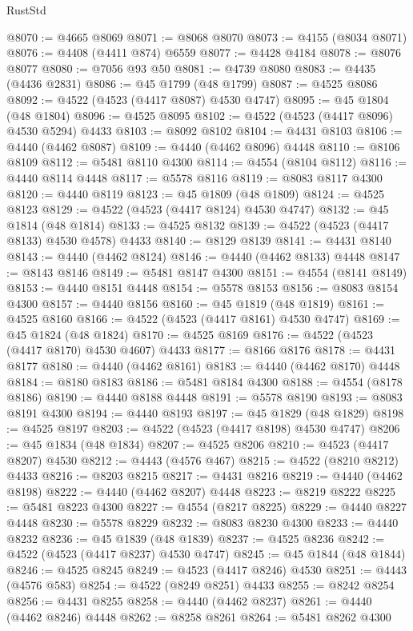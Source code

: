 \begin{lexlean}{RustStd}
\begin{coremodule}
{\begin{coremodule}
{{{{{{{{{{{{{{{{{{{{{{{{{{{{{{{{{{{{{{{{{{{{{{{{{{{{{{{{{{{{@8070 := @4665 @8069
@8071 := @8068 @8070
@8073 := @4155 (@8034 @8071)
@8076 := @4408 (@4411 @874) @6559
@8077 := @4428 @4184
@8078 := @8076 @8077
@8080 := @7056 @93 @50
@8081 := @4739 @8080
@8083 := @4435 (@4436 @2831)
@8086 := @45 @1799 (@48 @1799)
@8087 := @4525 @8086
@8092 := @4522 (@4523 (@4417 @8087) @4530 @4747)
@8095 := @45 @1804 (@48 @1804)
@8096 := @4525 @8095
@8102 := @4522 (@4523 (@4417 @8096) @4530 @5294) @4433
@8103 := @8092 @8102
@8104 := @4431 @8103
@8106 := @4440 (@4462 @8087)
@8109 := @4440 (@4462 @8096) @4448
@8110 := @8106 @8109
@8112 := @5481 @8110 @4300
@8114 := @4554 (@8104 @8112)
@8116 := @4440 @8114 @4448
@8117 := @5578 @8116
@8119 := @8083 @8117 @4300
@8120 := @4440 @8119
@8123 := @45 @1809 (@48 @1809)
@8124 := @4525 @8123
@8129 := @4522 (@4523 (@4417 @8124) @4530 @4747)
@8132 := @45 @1814 (@48 @1814)
@8133 := @4525 @8132
@8139 := @4522 (@4523 (@4417 @8133) @4530 @4578) @4433
@8140 := @8129 @8139
@8141 := @4431 @8140
@8143 := @4440 (@4462 @8124)
@8146 := @4440 (@4462 @8133) @4448
@8147 := @8143 @8146
@8149 := @5481 @8147 @4300
@8151 := @4554 (@8141 @8149)
@8153 := @4440 @8151 @4448
@8154 := @5578 @8153
@8156 := @8083 @8154 @4300
@8157 := @4440 @8156
@8160 := @45 @1819 (@48 @1819)
@8161 := @4525 @8160
@8166 := @4522 (@4523 (@4417 @8161) @4530 @4747)
@8169 := @45 @1824 (@48 @1824)
@8170 := @4525 @8169
@8176 := @4522 (@4523 (@4417 @8170) @4530 @4607) @4433
@8177 := @8166 @8176
@8178 := @4431 @8177
@8180 := @4440 (@4462 @8161)
@8183 := @4440 (@4462 @8170) @4448
@8184 := @8180 @8183
@8186 := @5481 @8184 @4300
@8188 := @4554 (@8178 @8186)
@8190 := @4440 @8188 @4448
@8191 := @5578 @8190
@8193 := @8083 @8191 @4300
@8194 := @4440 @8193
@8197 := @45 @1829 (@48 @1829)
@8198 := @4525 @8197
@8203 := @4522 (@4523 (@4417 @8198) @4530 @4747)
@8206 := @45 @1834 (@48 @1834)
@8207 := @4525 @8206
@8210 := @4523 (@4417 @8207) @4530
@8212 := @4443 (@4576 @467)
@8215 := @4522 (@8210 @8212) @4433
@8216 := @8203 @8215
@8217 := @4431 @8216
@8219 := @4440 (@4462 @8198)
@8222 := @4440 (@4462 @8207) @4448
@8223 := @8219 @8222
@8225 := @5481 @8223 @4300
@8227 := @4554 (@8217 @8225)
@8229 := @4440 @8227 @4448
@8230 := @5578 @8229
@8232 := @8083 @8230 @4300
@8233 := @4440 @8232
@8236 := @45 @1839 (@48 @1839)
@8237 := @4525 @8236
@8242 := @4522 (@4523 (@4417 @8237) @4530 @4747)
@8245 := @45 @1844 (@48 @1844)
@8246 := @4525 @8245
@8249 := @4523 (@4417 @8246) @4530
@8251 := @4443 (@4576 @583)
@8254 := @4522 (@8249 @8251) @4433
@8255 := @8242 @8254
@8256 := @4431 @8255
@8258 := @4440 (@4462 @8237)
@8261 := @4440 (@4462 @8246) @4448
@8262 := @8258 @8261
@8264 := @5481 @8262 @4300
}}}}}}}}}}}}}}}}}}}}}}}}}}}}}}}}}}}}}}}}}}}}}}}}}}}}}}}}}}}}
\end{coremodule}}
\end{coremodule}
\end{lexlean}
